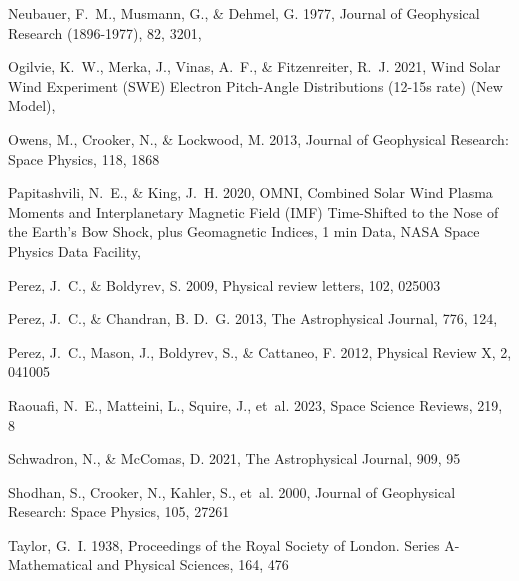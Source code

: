 \documentclass[twocolumn, times]{aastex631}
\begin{document}
\begin{thebibliography}{}
Neubauer, F.~M., Musmann, G., \& Dehmel, G. 1977, Journal of Geophysical Research (1896-1977), 82, 3201, 

Ogilvie, K.~W., Merka, J., Vinas, A.~F., \& Fitzenreiter, R.~J. 2021, Wind Solar Wind Experiment (SWE) Electron Pitch-Angle Distributions (12-15s rate) (New Model), 

Owens, M., Crooker, N., \& Lockwood, M. 2013, Journal of Geophysical Research: Space Physics, 118, 1868

Papitashvili, N.~E., \& King, J.~H. 2020, {OMNI, Combined Solar Wind Plasma Moments and Interplanetary Magnetic Field (IMF) Time-Shifted to the Nose of the Earth's Bow Shock, plus Geomagnetic Indices, 1 min Data},  NASA Space Physics Data Facility, 

Perez, J.~C., \& Boldyrev, S. 2009, Physical review letters, 102, 025003

Perez, J.~C., \& Chandran, B. D.~G. 2013, The Astrophysical Journal, 776, 124, 

Perez, J.~C., Mason, J., Boldyrev, S., \& Cattaneo, F. 2012, Physical Review X, 2, 041005

Raouafi, N.~E., Matteini, L., Squire, J., {et~al.} 2023, Space Science Reviews, 219, 8

Schwadron, N., \& McComas, D. 2021, The Astrophysical Journal, 909, 95

Shodhan, S., Crooker, N., Kahler, S., {et~al.} 2000, Journal of Geophysical Research: Space Physics, 105, 27261

Taylor, G.~I. 1938, Proceedings of the Royal Society of London. Series A-Mathematical and Physical Sciences, 164, 476


\end{thebibliography}
\end{document}
